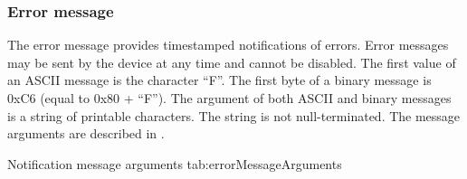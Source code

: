 \subsubsection{Error message}

The error message provides timestamped notifications of errors.  Error messages may be sent by the device at any time and cannot be disabled.  The first value of an \ac{ASCII} message is the character \enquote{F}.  The first byte of a binary message is 0xC6 (equal to 0x80 + \enquote{F}).  The argument of both \ac{ASCII} and binary messages is a string of printable characters.  The string is not null-terminated.  The message arguments are described in .

\begingroup
    \def\tempArgumentA{Error string}
    \dataMessageTable
    {Notification message arguments}
    {tab:errorMessageArguments}
\endgroup

\begingroup
    \def\tempNameA{String}
    \def\tempValueA{This is an error message.}
    \def\tempAsciiFirst{F}
    \def\tempAsciiA{This is an error message.}
    \def\tempBinaryFirst{C6}
    \def\tempBinaryA{54 68 69 73 20 69 73 20 61 6E 20 65 72 72 6F 72 20 6D 65 73 73 61 67 65 2E}
    \dataMessageExample
\endgroup





